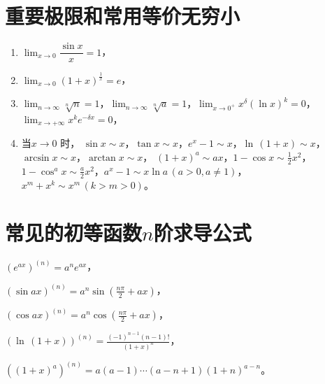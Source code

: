 \documentclass[UTF8]{ctexart}
\begin{document}
\section{重要极限和常用等价无穷小}
  \begin{enumerate}[(1)]%
    \item $ \lim_{x \to 0}\dfrac{\sin x}{x}=1 $，
    \item $ \lim_{x \to 0}(1+x)^{\frac{1}{x}}=e $，
    \item $ \lim_{n \to \infty}\sqrt[n]{n}=1 $，$ \lim_{n \to \infty}\sqrt[n]{a}=1 $，$ \lim_{x \to 0^+}x^\delta (\ln x)^k=0 $，$ \lim_{x \to +\infty}x^k e^{-\delta x}=0 $，
    \item 当$x \to 0$ 时，
    $ \sin x \sim x $，$ \tan x \sim x $，$ e^x-1\sim x $，$ \ln\, (1+x)\sim x $，$ \arcsin x \sim x $，$ \arctan x \sim x $，
    $ (1+x)^a\sim ax $，$ 1-\cos x \sim \frac{1}{2}x^2 $，$ 1-\cos^a x \sim \frac{a}{2}x^2 $，$ a^x-1\sim x\ln a \,(a>0,a\ne 1) $，$ x^m+x^k \sim x^m \,(k>m>0) $。
  \end{enumerate}


\section{常见的初等函数$n$阶求导公式}
  \begin{tabenum}[(1)] \qquad \qquad
    \item $ (e^{ax})^{(n)}=a^n e^{ax} $，\\
    \item $ (\sin ax)^{(n)}=a^n\sin (\frac{n\pi}{2}+ax) $，\\
    \item $ (\cos ax)^{(n)}=a^n\cos (\frac{n\pi}{2}+ax) $，\\
    \item $ (\ln\,(1+x))^{(n)}=\frac{(-1)^{n-1}(n-1)!}{(1+x)^n} $，\\
    \item $ ((1+x)^a)^{(n)}=a(a-1)\cdots (a-n+1)(1+n)^{a-n} $。
  \end{tabenum}
\end{document}
